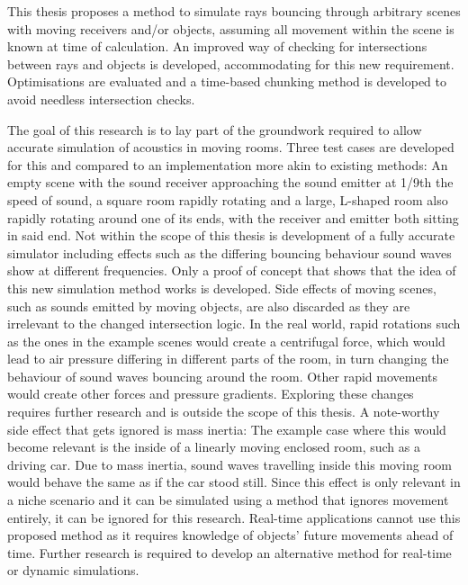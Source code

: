 This thesis proposes a method to simulate rays bouncing through arbitrary scenes with moving receivers and/or objects,
assuming all movement within the scene is known at time of calculation.
An improved way of checking for intersections between rays and objects is developed, accommodating for this new requirement.
\newline
Optimisations are evaluated and a time-based chunking method is developed to avoid needless intersection checks.
\iffalse
    Additionally, a method is developed to to losslessly and efficiently store the multiple impulse responses created by re-calculating
    the impulse responses for different points in time.
\fi
\newline
The goal of this research is to lay part of the groundwork required to allow accurate simulation of acoustics in moving rooms.
\newline
Three test cases are developed for this and compared to an implementation more akin to existing methods:
An empty scene with the sound receiver approaching the sound emitter at 1/9th the speed of sound,
a square room rapidly rotating
and a large, L-shaped room also rapidly rotating around one of its ends, with the receiver and emitter both sitting in said end.
\newline
Not within the scope of this thesis is development of a fully accurate simulator
including effects such as the differing bouncing behaviour sound waves show at different frequencies.
Only a proof of concept that shows that the idea of this new simulation method works is developed.
\newline
Side effects of moving scenes, such as sounds emitted by moving objects, are also discarded as they are irrelevant to
the changed intersection logic.
\newline
In the real world, rapid rotations such as the ones in the example scenes would create a centrifugal force,
which would lead to air pressure differing in different parts of the room,
in turn changing the behaviour of sound waves bouncing around the room.
Other rapid movements would create other forces and pressure gradients.
Exploring these changes requires further research and is outside the scope of this thesis.
\newline
A note-worthy side effect that gets ignored is mass inertia:
The example case where this would become relevant is the inside of a linearly moving enclosed room, such as a driving car.
Due to mass inertia, sound waves travelling inside this moving room would behave the same as if the car stood still.
Since this effect is only relevant in a niche scenario and it can be simulated using a method that ignores movement entirely,
it can be ignored for this research.
\newline
Real-time applications cannot use this proposed method as it requires knowledge of objects' future movements ahead of time.
Further research is required to develop an alternative method for real-time or dynamic simulations.

